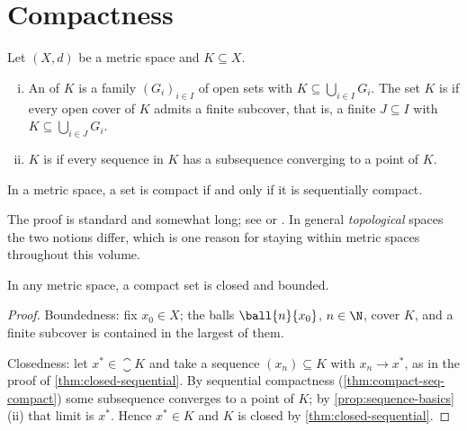 \section{Compactness}\label{sec:top-compact}

\begin{definition}[Compactness]\label{def:compact}
	Let $(X,d)$ be a metric space and $K\subseteq X$.
	\begin{enumerate}[(i)]
		\item An  of $K$ is a family $(G_i)_{i\in I}$ of open sets with
		      $K\subseteq\bigcup_{i\in I}G_i$. The set $K$ is  if every
		      open cover of $K$ admits a finite subcover, that is, a finite
		      $J\subseteq I$ with $K\subseteq\bigcup_{i\in J}G_i$.
		\item $K$ is  if every
		      sequence in $K$ has a subsequence converging to a point of $K$.
	\end{enumerate}
\end{definition}

\begin{theorem}
	\label{thm:compact-seq-compact}
	In a metric space, a set is compact if and only if it is sequentially compact.
\end{theorem}

The proof is standard and somewhat long; see
\textcite[Thm.~3.28 and its converse]{rudin1976principles} or
\textcite[Sec.~8.1]{fukuda2026notes}. In general \emph{topological} spaces the
two notions differ, which is one reason for staying within metric spaces
throughout this volume.

\begin{proposition}\label{prop:compact-closed-bounded}
	In any metric space, a compact set is closed and bounded.
\end{proposition}

\begin{proof}
	Boundedness: fix $x_0\in X$; the balls $\ball{n}{x_0}$, $n\in\N$, cover $K$, and
	a finite subcover is contained in the largest of them.

	Closedness: let $x^\ast\in\closure K$ and take a sequence
	$(x_n)\subseteq K$ with $x_n\to x^\ast$, as in the proof of
	\autoref{thm:closed-sequential}. By sequential compactness
	(\autoref{thm:compact-seq-compact}) some subsequence converges to a point of
	$K$; by \autoref{prop:sequence-basics}(ii) that limit is $x^\ast$. Hence
	$x^\ast\in K$ and $K$ is closed by \autoref{thm:closed-sequential}.
\end{proof}

